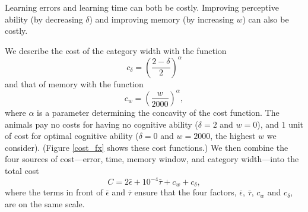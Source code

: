 Learning errors and learning time can both be costly. Improving  perceptive ability (by decreasing $\delta$) and improving memory (by increasing $w$) can also be costly. %

We describe the cost of the category width with the function
\begin{equation*}
c_\delta = \left(\frac{2-\delta}{2}\right)^\alpha
\end{equation*}
and that of memory with the function
\begin{equation*}
c_w = \left(\frac{w}{2000}\right)^\alpha,
\end{equation*}
where $\alpha$ is a parameter determining the concavity of the cost function. The animals pay no costs for having no cognitive ability ($\delta=2$ and $w=0$), and $1$ unit of cost for optimal cognitive ability ($\delta=0$ and $w=2000$, the highest $w$ we consider). (Figure \ref{cost_fx} shows these cost functions.)
We then combine the four sources of cost---error, time, memory window, and category width---into the total cost 
\begin{equation*}
C = 2\bar{\epsilon}+10^{-4}\bar{\tau}+c_w+c_\delta,
\end{equation*}
where the terms in front of $\bar{\epsilon}$ and $\bar{\tau}$ ensure that the four factors, $\bar{\epsilon}$, $\bar{\tau}$, $c_w$ and $c_\delta$, are on the same scale. 

